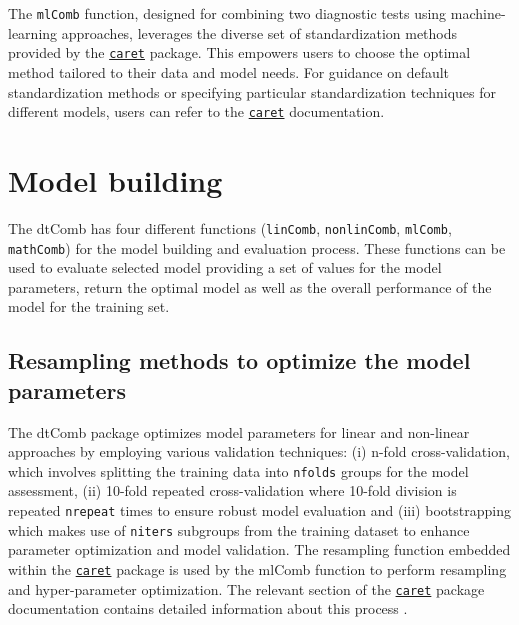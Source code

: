 \documentclass[10pt]{article}
\newcommand{\CRANpkg}[1]{\href{https://cran.r-project.org/web/packages/#1/index.html}{\texttt{#1}}}
\newcommand{\Rfunction}[1]{\texttt{#1}}
\begin{document}
The \Rfunction{mlComb} function, designed for combining two diagnostic tests using machine-learning approaches, leverages the diverse set of standardization methods provided by the \CRANpkg{caret} package. This empowers users to choose the optimal method tailored to their data and model needs. For guidance on default standardization methods or specifying particular standardization techniques for different models, users can refer to the \CRANpkg{caret} documentation.
\section{Model building}
The dtComb has four different functions (\texttt{linComb}, \texttt{nonlinComb}, \texttt{mlComb}, \texttt{mathComb}) for the model building and evaluation process. These functions can be used to evaluate selected model providing a set of values for the model parameters, return the optimal model as well as the overall performance of the model for the training set.
\subsection{Resampling methods to optimize the model parameters}
The dtComb package optimizes model parameters for linear and non-linear approaches by employing various validation techniques: (i) n-fold cross-validation, which involves splitting the training data into \texttt{nfolds} groups for the model assessment, (ii) 10-fold repeated cross-validation where 10-fold division is repeated \texttt{nrepeat} times to ensure robust model evaluation and (iii) bootstrapping which makes use of \texttt{niters} subgroups from the training dataset to enhance parameter optimization and model validation. The resampling function embedded within the \CRANpkg{caret} package is used by the mlComb function to perform resampling and hyper-parameter optimization. The relevant section of the \CRANpkg{caret} package documentation contains detailed information about this process \citep{kuhn2008building}.
\end{document}
